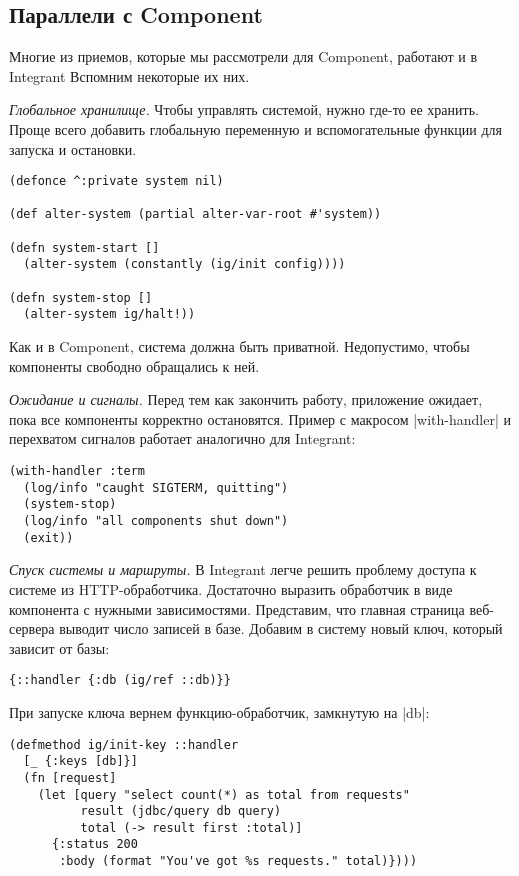 \subsection{Параллели с Component}

Многие из приемов, которые мы рассмотрели для Component, работают и в Integrant
Вспомним некоторые их них.

\emph{Глобальное хранилище.} Чтобы управлять системой, нужно где-то ее
хранить. Проще всего добавить глобальную переменную и вспомогательные функции
для запуска и остановки.

\begin{verbatim}
(defonce ^:private system nil)

(def alter-system (partial alter-var-root #'system))

(defn system-start []
  (alter-system (constantly (ig/init config))))

(defn system-stop []
  (alter-system ig/halt!))
\end{verbatim}

Как и в Component, система должна быть приватной. Недопустимо, чтобы компоненты
свободно обращались к ней.

\emph{Ожидание и сигналы.} Перед тем как закончить работу, приложение ожидает, пока
все компоненты корректно остановятся. Пример с макросом \spverb|with-handler| и
перехватом сигналов работает аналогично для Integrant:

\begin{verbatim}
(with-handler :term
  (log/info "caught SIGTERM, quitting")
  (system-stop)
  (log/info "all components shut down")
  (exit))
\end{verbatim}

\emph{Спуск системы и маршруты.} В Integrant легче решить проблему доступа к
системе из HTTP-обработчика. Достаточно выразить обработчик в виде компонента с
нужными зависимостями. Представим, что главная страница веб-сервера выводит
число записей в базе. Добавим в систему новый ключ, который зависит от базы:

\begin{verbatim}
{::handler {:db (ig/ref ::db)}}
\end{verbatim}

При запуске ключа вернем функцию-обработчик, замкнутую на \spverb|db|:

\begin{verbatim}
(defmethod ig/init-key ::handler
  [_ {:keys [db]}]
  (fn [request]
    (let [query "select count(*) as total from requests"
          result (jdbc/query db query)
          total (-> result first :total)]
      {:status 200
       :body (format "You've got %s requests." total)})))
\end{verbatim}

